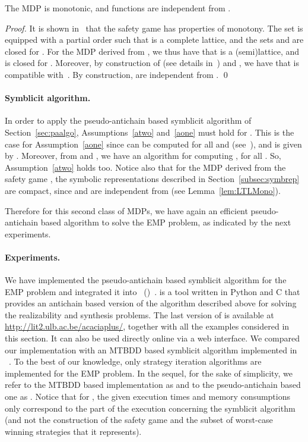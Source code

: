 \begin{lemma}  \label{lem:LTLMono}
The MDP  is monotonic, and functions  are independent from . 
\end{lemma}

\begin{proof}
It is shown in~\cite{DBLP:journals/corr/abs-1210-3539,DBLP:conf/tacas/BohyBFR13} that the safety game  has properties of monotony. The set  is equipped with a partial order  such that  is a complete lattice, and the sets  and  are closed for . For the MDP  derived from , we thus have that  is a (semi)lattice, and  is closed for . Moreover, by construction of  (see details in~\cite[Sec. 5.1]{DBLP:journals/corr/abs-1210-3539}) and , 
we have that  is compatible with~. By construction,  are independent from .
\qed\end{proof}


\paragraph{Symblicit algorithm.} 
In order to apply the pseudo-antichain based symblicit algorithm of Section~\ref{sec:paalgo}, Assumptions~\ref{atwo} and~\ref{aone} must hold for . This is the case for Assumption~\ref{aone} since  can be computed for all  and  (see~\cite[Sec. 5.1]{DBLP:journals/corr/abs-1210-3539}), and  is given by . Moreover, from \cite[Prop. 24]{DBLP:journals/corr/abs-1210-3539} and , we have an algorithm for computing , for all . So, Assumption~\ref{atwo} holds too. 
Notice also that for the MDP  derived from the safety game , the symbolic representations described in Section~\ref{subsec:symbrep} are compact, since  and  are independent from  (see Lemma~\ref{lem:LTLMono}).

Therefore for this second class of MDPs, we have again an efficient pseudo-antichain based algorithm to solve the EMP problem, as indicated by the next experiments.

\paragraph{Experiments.} We have implemented the pseudo-antichain based symblicit algorithm for the EMP problem and integrated it into ~()~\cite{DBLP:conf/cav/BohyBFJR12}.  is a tool written in Python and C that provides an antichain based version of the algorithm described above for solving the  realizability and synthesis problems. The last version of  is available at \url{http://lit2.ulb.ac.be/acaciaplus/}, together with all the examples considered in this section. It can also be used directly online via a web interface. We compared our implementation with an MTBDD based symblicit algorithm implemented in ~\cite{prismEMP}. To the best of our knowledge, only strategy iteration algorithms are implemented for the EMP problem. In the sequel, for the sake of simplicity, we refer to the MTBDD based implementation as  and to the pseudo-antichain based one as . Notice that for , the given execution times and memory consumptions only correspond to the part of the execution concerning the symblicit algorithm (and not the construction of the safety game  and the subset of worst-case winning strategies that it represents).

